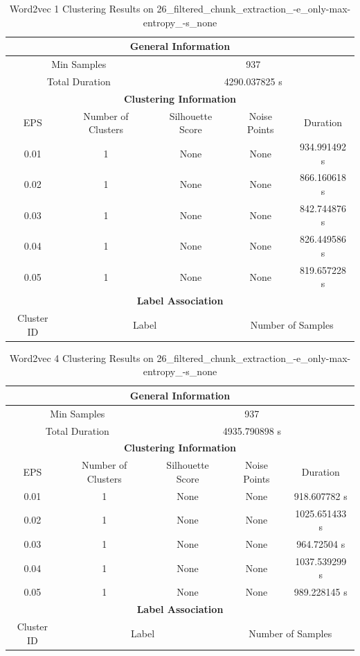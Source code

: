 \begin{longtable}{|c|c|c|c|c|}
\caption{Word2vec 1 Clustering Results on 26\_filtered\_chunk\_extraction\_-e\_only-max-entropy\_-s\_none} \label{tab:26_filtered_chunk_extraction_-e_only-max-entropy_-s_none_word2vec_1_clustering_results}\\
\hline
\multicolumn{5}{|c|}{\textbf{General Information}} \\
\hline
\multicolumn{2}{|c|}{Min Samples} & \multicolumn{3}{c|}{937} \\
\multicolumn{2}{|c|}{Total Duration} & \multicolumn{3}{c|}{4290.037825 s} \\
\hline
\multicolumn{5}{|c|}{\textbf{Clustering Information}} \\
\hline
EPS & Number of Clusters & Silhouette Score & Noise Points & Duration \\
0.01 & 1 & None & None & 934.991492 s\\
0.02 & 1 & None & None & 866.160618 s\\
0.03 & 1 & None & None & 842.744876 s\\
0.04 & 1 & None & None & 826.449586 s\\
0.05 & 1 & None & None & 819.657228 s\\
\hline
\multicolumn{5}{|c|}{\textbf{Label Association}} \\
\hline
Cluster ID & \multicolumn{2}{c|}{Label} & \multicolumn{2}{c|}{Number of Samples} \\
\hline
\end{longtable}


\begin{longtable}{|c|c|c|c|c|}
\caption{Word2vec 4 Clustering Results on 26\_filtered\_chunk\_extraction\_-e\_only-max-entropy\_-s\_none} \label{tab:26_filtered_chunk_extraction_-e_only-max-entropy_-s_none_word2vec_4_clustering_results}\\
\hline
\multicolumn{5}{|c|}{\textbf{General Information}} \\
\hline
\multicolumn{2}{|c|}{Min Samples} & \multicolumn{3}{c|}{937} \\
\multicolumn{2}{|c|}{Total Duration} & \multicolumn{3}{c|}{4935.790898 s} \\
\hline
\multicolumn{5}{|c|}{\textbf{Clustering Information}} \\
\hline
EPS & Number of Clusters & Silhouette Score & Noise Points & Duration \\
0.01 & 1 & None & None & 918.607782 s\\
0.02 & 1 & None & None & 1025.651433 s\\
0.03 & 1 & None & None & 964.72504 s\\
0.04 & 1 & None & None & 1037.539299 s\\
0.05 & 1 & None & None & 989.228145 s\\
\hline
\multicolumn{5}{|c|}{\textbf{Label Association}} \\
\hline
Cluster ID & \multicolumn{2}{c|}{Label} & \multicolumn{2}{c|}{Number of Samples} \\
\hline
\end{longtable}


